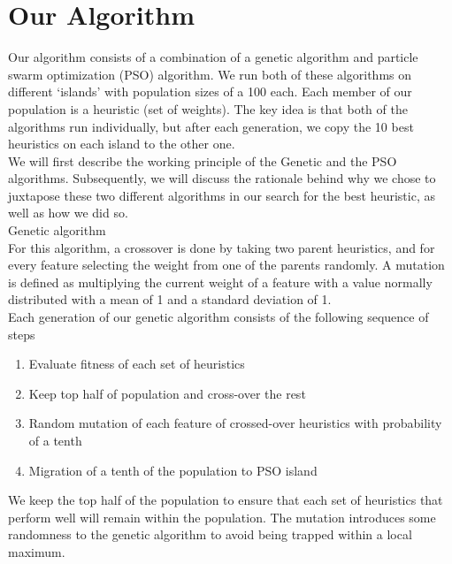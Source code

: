 \documentclass{article}
\begin{document}
    \section{Our Algorithm}

    Our algorithm consists of a combination of a genetic algorithm and particle swarm
	optimization (PSO) algorithm. We run both of these algorithms on different ‘islands’
	with population sizes of a 100 each. Each member of our population is a heuristic (set of weights).
	The key idea is that both of the algorithms run individually, but after each generation, we
	copy the 10 best heuristics on each island to the other one.\\
	\newline
	We will first describe the working principle
	of the Genetic and the PSO algorithms. Subsequently, we will
	discuss the rationale behind why we chose to juxtapose these two different
	algorithms in our search for the best heuristic, as well as how we did so.\\

	Genetic algorithm\\
	For this algorithm, a crossover is done by taking two parent heuristics, and
	for every feature selecting the weight from one of the parents randomly. A
	mutation is defined as multiplying the current weight of a feature with
	a value normally distributed with a mean of 1 and a standard deviation of 1.\\
	Each generation of our genetic algorithm consists of the following sequence of steps
	\begin{enumerate}
		\item Evaluate fitness of each set of heuristics
		\item Keep top half of population and cross-over the rest
		\item Random mutation of each feature of crossed-over heuristics with
		probability of a tenth
		\item Migration of a tenth of the population to PSO island
	\end{enumerate}
	We keep the top half of the population to ensure that each set of heuristics
	that perform well will remain within the population. The mutation introduces
	some randomness to the genetic algorithm to avoid being trapped within a local
	maximum.\\
\end{document}
